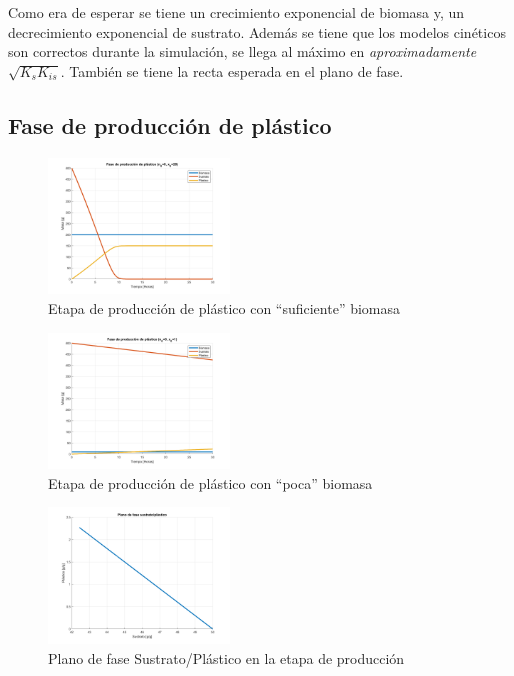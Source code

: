 \documentclass[letterpaper, 10 pt, conference]{ieeeconf}  %
\begin{document}
Como era de esperar se tiene un crecimiento exponencial de biomasa y, un decrecimiento exponencial de sustrato. Además se tiene que los modelos cinéticos son correctos durante la simulación, se llega al máximo en \textit{aproximadamente} $\sqrt{K_{s}K_{is}}$. También se tiene la recta esperada en el plano de fase.

\subsection{Fase de producción de plástico}

\begin{figure}[H]
  \centering
  \includegraphics[width=0.43\textwidth]{./Images_tp1/D0_prod_completa.png}
  \caption{Etapa de producción de plástico con ``suficiente'' biomasa}
  \label{fig:D0_prod_completa}
\end{figure}

\begin{figure}[H]
  \centering
  \includegraphics[width=0.43\textwidth]{./Images_tp1/D0_prod_completa_min_biomass.png}
  \caption{Etapa de producción de plástico con ``poca'' biomasa}
  \label{fig:D0_prod_completa_min_biomass}
\end{figure}

\begin{figure}[H]
  \centering
  \includegraphics[width=0.43\textwidth]{./Images_tp1/D0_plano_fase_plastic.png}
  \caption{Plano de fase Sustrato/Plástico en la etapa de producción}
  \label{fig:D0_fase_plastic}
\end{figure}
\end{document}
